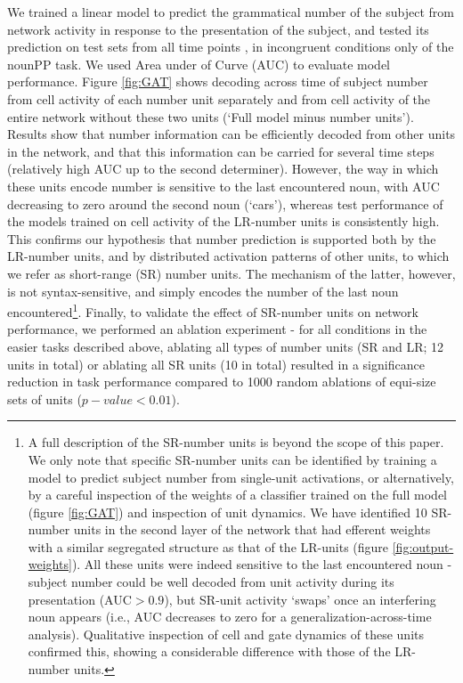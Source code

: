 We trained a linear model to predict the grammatical number of the
subject from network activity in response to the presentation of the
subject, and tested its prediction on test sets from all time points
, in incongruent conditions
only of the nounPP task.  We used Area under of Curve (AUC) to evaluate model
performance. Figure \ref{fig:GAT} shows decoding across time of
subject number from cell activity of each number unit separately and
from cell activity of the entire network without these two units
(`Full model minus number units'). Results show that number
information can be efficiently decoded from other units in the
network, and that this information can be carried for several time
steps (relatively high AUC up to the second determiner). However, the
way in which these units encode number is sensitive to the last
encountered noun, with AUC decreasing to zero around the second noun
(`cars'), whereas test performance of the models trained on cell activity of the LR-number units is consistently high. This confirms our
hypothesis that number prediction is supported both by the LR-number
units, and by distributed activation patterns of other units, to which we refer as short-range (SR) number units. The
mechanism of the latter, however, is not syntax-sensitive, and simply encodes
the number of the last noun encountered\footnote{A full description of the SR-number units is beyond the scope of this paper. We only note that specific SR-number units can be identified by training a model to predict subject number from single-unit activations, or alternatively, by a careful inspection of the weights of a classifier trained on the full model (figure \ref{fig:GAT}) and inspection of unit dynamics. We have identified 10 SR-number units in the second layer of the network that had efferent weights with a similar segregated structure as that of the LR-units (figure \ref{fig:output-weights}). All these units were indeed sensitive to the last encountered noun - subject number could be well decoded from unit activity during its presentation (AUC$>0.9$), but SR-unit activity `swaps' once an interfering noun appears (i.e., AUC decreases to zero for a generalization-across-time analysis). Qualitative inspection of cell and gate dynamics of these units confirmed this, showing a considerable difference with those of the LR-number units.}. Finally, to validate the effect of SR-number units on network performance, we performed an ablation experiment - for all conditions in the easier tasks described above, ablating all types of number units (SR and LR; 12 units in total) or ablating all SR units (10 in total) resulted in a significance reduction in task performance compared to 1000 random ablations of equi-size sets of units ($p-value<0.01$).
